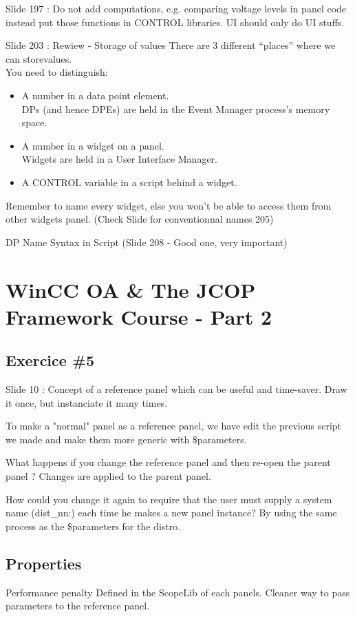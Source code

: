 \documentclass[a4paper, 10pt]{article}
\begin{document}
Slide 197 : Do not add computations, e.g. comparing voltage levels in panel code instead put those functions in CONTROL libraries. UI should only do UI stuffs.

Slide 203 : Rewiew - Storage of values
There are 3 different “places” where we can storevalues.\\
You need to distinguish:
\begin{itemize}
    \item A number in a data point element.\\
DPs (and hence DPEs) are held in the Event Manager process’s memory space.
    \item A number in a widget on a panel.\\
Widgets are held in a User Interface Manager.
    \item A CONTROL variable in a script behind a widget.
\end{itemize}

Remember to name every widget, else you won't be able to access them from other widgets panel.
(Check Slide for conventionnal names 205)

DP Name Syntax in Script (Slide 208 - Good one, very important)

\section{WinCC OA \&  The JCOP Framework Course - Part 2}
\subsection{Exercice \#5}
Slide 10 : Concept of a reference panel which can be useful and time-saver.
Draw it once, but instanciate it many times.

To make a "normal" panel as a reference panel, we have edit the previous script we made and make them more generic with \$parameters.

What happens if you change the reference panel and then re-open the parent panel ?
Changes are applied to the parent panel.

How could you change it again to require that the user must supply a system name (dist\_nn:) each time he makes a new panel instance?
By using the same process as the \$parameters for the distro.

\subsection{Properties}
Performance penalty
Defined in the ScopeLib of each panels.
Cleaner way to pass parameters to the reference panel.
\end{document}
